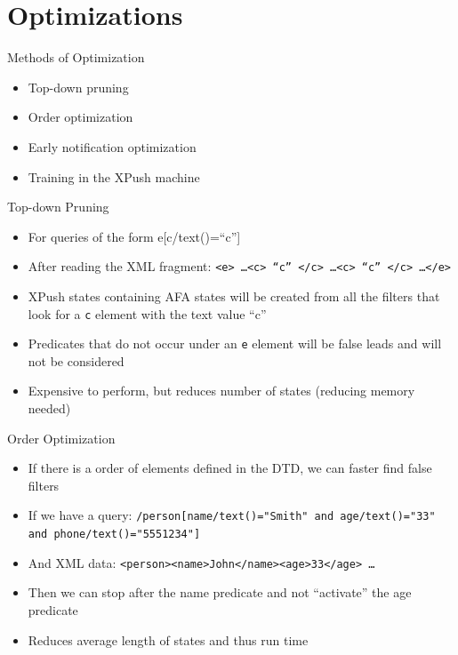 \documentclass[mathserif,serif]{beamer}
\begin{document}
\section{Optimizations}
\begin{frame}{Methods of Optimization}
  \begin{itemize}
    \item Top-down pruning
    \item Order optimization
    \item Early notification optimization
    \item Training in the XPush machine
  \end{itemize}
\end{frame}

\begin{frame}{Top-down Pruning}
  \begin{itemize}
    \item For queries of the form e[c/text()=``c'']
    \item After reading the XML fragment: \texttt{<e> \dots <c> ``c'' </c> \dots <c> ``c'' </c> \dots </e>}
    \item XPush states containing AFA states will be created from all the filters that look for a \texttt{c} element with the text value ``c'' 
    \item Predicates that do not occur under an \texttt{e} element will be false leads and will not be considered
    \item Expensive to perform, but reduces number of states (reducing memory needed)
  \end{itemize}
\end{frame}

\begin{frame}{Order Optimization}
  \begin{itemize}
    \item If there is a order of elements defined in the DTD, we can faster find false filters
    \item If we have a query: \texttt{/person[name/text()="Smith" and age/text()="33" and phone/text()="5551234"]}
    \item And XML data: \texttt{<person><name>John</name><age>33</age> \dots}
    \item Then we can stop after the name predicate and not ``activate'' the age predicate
    \item Reduces average length of states and thus run time 
  \end{itemize}
\end{frame}
\end{document}
